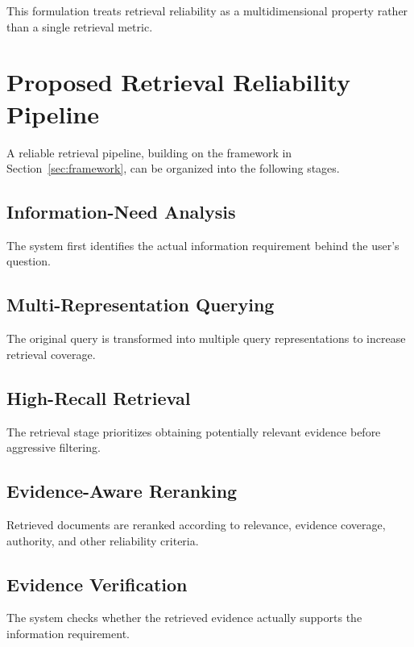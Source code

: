 \documentclass[12pt,a4paper]{article}
\begin{document}
This formulation treats retrieval reliability as a multidimensional
property rather than a single retrieval metric.

\section{Proposed Retrieval Reliability Pipeline}
\label{sec:pipeline}

A reliable retrieval pipeline, building on the framework in
Section~\ref{sec:framework}, can be organized into the following stages.

\subsection{Information-Need Analysis}

The system first identifies the actual information requirement behind the
user's question.

\subsection{Multi-Representation Querying}

The original query is transformed into multiple query representations to
increase retrieval coverage.

\subsection{High-Recall Retrieval}

The retrieval stage prioritizes obtaining potentially relevant evidence
before aggressive filtering.

\subsection{Evidence-Aware Reranking}

Retrieved documents are reranked according to relevance, evidence
coverage, authority, and other reliability criteria.

\subsection{Evidence Verification}

The system checks whether the retrieved evidence actually supports the
information requirement.
\end{document}
